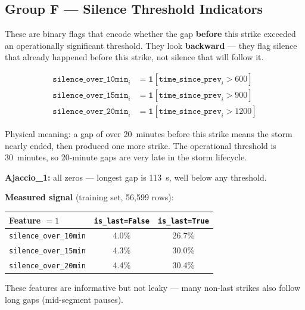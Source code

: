 \documentclass[12pt,a4paper]{article}
\begin{document}
\vspace{1em}

\subsection{Group F --- Silence Threshold Indicators}

These are binary flags that encode whether the gap \textbf{before} this strike exceeded an operationally significant threshold. They look \textbf{backward} --- they flag silence that already happened before this strike, not silence that will follow it.

\begin{formulabox}
\begin{align}
  \texttt{silence\_over\_10min}_i &= \mathbf{1}[\texttt{time\_since\_prev}_i > 600] \\
  \texttt{silence\_over\_15min}_i &= \mathbf{1}[\texttt{time\_since\_prev}_i > 900] \\
  \texttt{silence\_over\_20min}_i &= \mathbf{1}[\texttt{time\_since\_prev}_i > 1200]
\end{align}
\end{formulabox}

Physical meaning: a gap of over 20~minutes before this strike means the storm nearly ended, then produced one more strike. The operational threshold is 30~minutes, so 20-minute gaps are very late in the storm lifecycle.

\textbf{Ajaccio\_1:} all zeros --- longest gap is 113~s, well below any threshold.

\textbf{Measured signal} (training set, 56,599 rows):

\begin{center}
\begin{tabular}{lcc}
\toprule
Feature $= 1$ & \texttt{is\_last=False} & \texttt{is\_last=True} \\
\midrule
\texttt{silence\_over\_10min} & 4.0\% & 26.7\% \\
\texttt{silence\_over\_15min} & 4.3\% & 30.0\% \\
\texttt{silence\_over\_20min} & 4.4\% & 30.4\% \\
\bottomrule
\end{tabular}
\end{center}

These features are informative but not leaky --- many non-last strikes also follow long gaps (mid-segment pauses).
\end{document}
